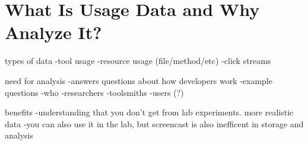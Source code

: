 \section{What Is Usage Data and Why Analyze It?}

types of data
	-tool usage
	-resource usage (file/method/etc)
	-click streams

need for analysis
	-answers questions about how developers work
	-example questions
	-who
		-researchers
		-toolsmiths
		-users (?)

benefits
	-understanding that you don't get from lab experiments. more realistic data
	-you can also use it in the lab, but screencast is also inefficent in storage and analysis